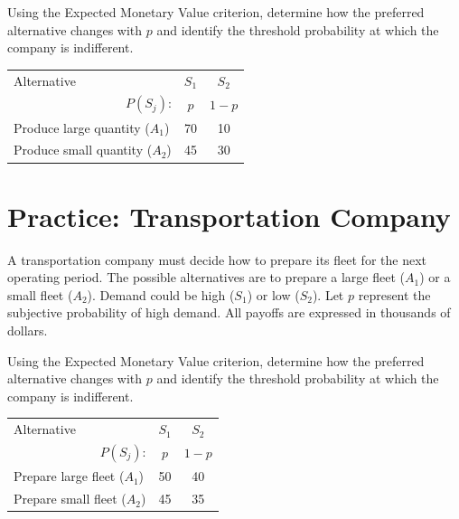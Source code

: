 \begin{multicols}{2}
	Using the Expected Monetary Value criterion, determine how the preferred
	alternative changes with $p$ and identify the threshold probability at
	which the company is indifferent.
	
	\vspace{-3mm}
	
	\begin{center}
		\renewcommand{\arraystretch}{1.3}
		\small
		\begin{tabular}{lr@{\qquad}cc}
			\cmidrule{1-4}
			Alternative & & $S_1$ & $S_2$ \\
			& $P(S_j)$: & $p$ & $1-p$ \\
			\cmidrule{1-4}
			\multicolumn{2}{l}{Produce large quantity ($A_1$)} & 70 & 10 \\
			\multicolumn{2}{l}{Produce small quantity ($A_2$)} & 45 & 30 \\
			\cmidrule{1-4}
		\end{tabular}
	\end{center}
	
	\vspace{-4mm}
	
	\section{Practice: Transportation Company}
	
	A transportation company must decide how to prepare its fleet for the
	next operating period. The possible alternatives are to prepare a large
	fleet ($A_1$) or a small fleet ($A_2$). Demand could be high ($S_1$) or low ($S_2$). Let $p$ represent the
	subjective probability of high demand. All payoffs are expressed in thousands of dollars.
	
	Using the Expected Monetary Value criterion, determine how the preferred
	alternative changes with $p$ and identify the threshold probability at
	which the company is indifferent.
	
	\vspace{-3mm}
	
	\begin{center}
		\renewcommand{\arraystretch}{1.3}
		\small
		\begin{tabular}{lr@{\qquad}cc}
			\cmidrule{1-4}
			Alternative & & $S_1$ & $S_2$ \\
			& $P(S_j)$: & $p$ & $1-p$ \\
			\cmidrule{1-4}
			\multicolumn{2}{l}{Prepare large fleet ($A_1$)} & 50 & 40 \\
			\multicolumn{2}{l}{Prepare small fleet ($A_2$)} & 45 & 35 \\
			\cmidrule{1-4}
		\end{tabular}
	\end{center}
	

\end{multicols}
